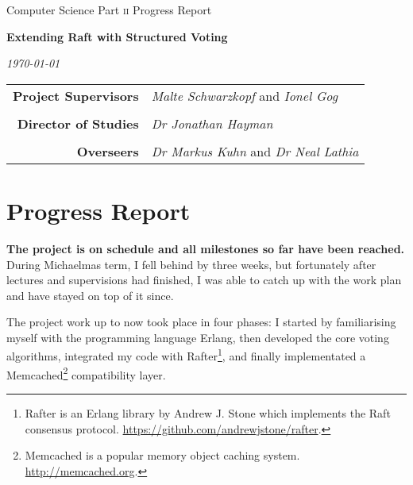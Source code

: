 \documentclass[11pt]{scrartcl}
\begin{document}
\thispagestyle{empty}

 \medskip
{} \medskip
{}

\vfil

\centerline{\large Computer Science Part \textsc{ii} Progress Report} \vspace{0.4in}
\centerline{\Large\bf Extending Raft with Structured Voting} \vspace{0.3in}
\centerline{\large\it \today}

\vfil

\begin{center}
\begin{tabularx}{316pt}{rX}
\textbf{Project Supervisors} & \textit{Malte Schwarzkopf} and \textit{Ionel Gog} \\ \\
\textbf{Director of Studies} & \textit{Dr Jonathan Hayman} \\ \\
\textbf{Overseers} & \textit{Dr Markus Kuhn} and \textit{Dr Neal Lathia}
\end{tabularx}
\end{center}

\newpage

\section{Progress Report%
  \label{progress-report}%
}

\textbf{The project is on schedule and all milestones so far have been reached.} During Michaelmas term, I fell behind by three weeks, but fortunately after lectures and supervisions had finished, I was able to catch up with the work plan and have stayed on top of it since.

The project work up to now took place in four phases: I started by familiarising myself with the programming language Erlang, then developed the core voting algorithms, integrated my code with Rafter\footnote{Rafter is an Erlang library by Andrew J. Stone which implements the Raft consensus protocol. \url{https://github.com/andrewjstone/rafter}.}, and finally implementated a Memcached\footnote{Memcached is a popular memory object caching system. \url{http://memcached.org}.} compatibility layer.
\end{document}
